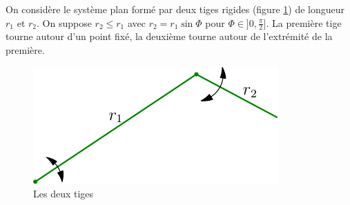 On considère le système plan formé par deux tiges rigides (figure \ref{fig:Eplanicom_1}) de longueur $r_1$ et $r_2$. On suppose $r_2 \leq r_1$ avec $r_2=r_1\sin \Phi$ pour $\Phi \in ]0,\frac{\pi}{2}]$. La première tige tourne autour d'un point fixé, la deuxième tourne autour de l'extrémité de la première.
\begin{figure}
	\centering
	\includegraphics{Eplanicom_1.pdf}
	\caption{Les deux tiges}
	\label{fig:Eplanicom_1}
\end{figure}

